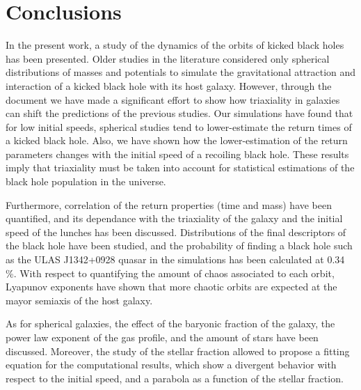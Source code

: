 
\chapter{Conclusions}\label{Conclusions}

In the present work, a study of the dynamics of the orbits of kicked black holes has been presented. Older studies in the literature considered only spherical distributions of masses and potentials to simulate the gravitational attraction and interaction of a kicked black hole with its host galaxy. However, through the document we have made a significant effort to show how triaxiality in galaxies can shift the predictions of the previous studies. Our simulations have found that for low initial speeds, spherical studies tend to lower-estimate the return times of a kicked black hole. Also, we have shown how the lower-estimation of the return parameters changes with the initial speed of a recoiling black hole. These results imply that triaxiality must be taken into account for statistical estimations of the black hole population in the universe.

Furthermore, correlation of the return properties (time and mass) have been quantified, and its dependance with the triaxiality of the galaxy and the initial speed of the lunches has been discussed. Distributions of the final descriptors of the black hole have been studied, and the probability of finding a black hole such as the ULAS J1342+0928 quasar in the simulations has been calculated at 0.34 \%. With respect to quantifying the amount of chaos associated to each orbit, Lyapunov exponents have shown that more chaotic orbits are expected at the mayor semiaxis of the host galaxy. 

As for spherical galaxies, the effect of the baryonic fraction of the galaxy, the power law exponent of the gas profile, and the amount of stars have been discussed. Moreover, the study of the stellar fraction allowed to propose a fitting equation for the computational results, which show a divergent behavior with respect to the initial speed, and a parabola as a function of the stellar fraction.


